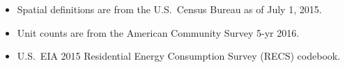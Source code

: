 \begin{itemize}
\item Spatial definitions are from the U.S.~Census Bureau as of July 1, 2015.
\item Unit counts are from the American Community Survey 5-yr 2016.
\item U.S.~EIA 2015 Residential Energy Consumption Survey (RECS) codebook.
\end{itemize}
